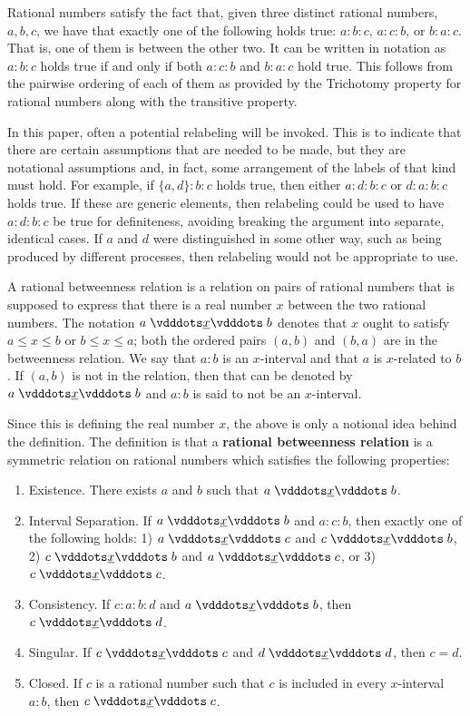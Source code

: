 \documentclass[12pt]{article}
\begin{document}
Rational numbers satisfy the fact that, given three distinct rational numbers, $a, b, c$, we have that exactly one of the following holds true: $a:b:c$, $a:c:b$, or $b:a:c$. That is, one of them is between the other two. It can be written in notation as $a:b:c$ holds true if and only if both \sout{$a:c:b$} and \sout{$b:a:c$} hold true. This follows from the pairwise ordering of each of them as provided by the Trichotomy property for rational numbers along with the transitive property. 

In this paper, often a potential relabeling will be invoked. This is to indicate that there are certain assumptions that are needed to be made, but they are notational assumptions and, in fact, some arrangement of the labels of that kind must hold. For example, if $\{a,d\}:b:c$ holds true, then either $a:d:b:c$ or $d:a:b:c$ holds true. If these are generic elements, then relabeling could be used to have $a:d:b:c$  be  true for definiteness, avoiding breaking the argument into separate, identical cases. If $a$ and $d$ were distinguished in some other way, such as being produced by different processes, then relabeling would not be appropriate to use. 

A rational betweenness relation is a relation on pairs of rational numbers that is supposed to express that there is a real number $x$ between the two rational numbers. The notation $a \xrel b$ denotes that $x$ ought to satisfy $a \leq x \leq b$ or $b \leq x \leq a$;  both the ordered pairs $(a,b)$ and $(b,a)$ are in the betweenness relation. We say that $a:b$ is an $x$-interval and that $a$ is $x$-related to $b$. If $(a,b)$ is not in the relation, then that can be denoted by \sout{$a \xrel b$} and $a:b$ is said to not be an $x$-interval. 

Since this is defining the real number $x$, the above is only a notional idea behind the definition. The definition is that a \textbf{rational betweenness relation} is a symmetric relation on rational numbers 
which satisfies the following properties:
\begin{enumerate}
    \item Existence. There exists $a$ and $b$ such that $a\xrel b$.
    \item Interval Separation. If $a \xrel b$ and $a : c : b$, then exactly one of the following holds: 1) $a \xrel c$ and \sout{$c \xrel b$}, 2) $c \xrel b$ and \sout{$a \xrel c$}, or 3) $c \xrel c$. 
    \item Consistency. If $c : a : b : d$ and $a \xrel b$, then $c \xrel d$. 
    \item Singular. If $c \xrel c$ and $d \xrel d$, then $c=d$. 
    \item Closed. If $c$ is a rational number such that $c$ is included in every $x$-interval $a:b$, then  $c \xrel c$. 
\end{enumerate}
\end{document}
